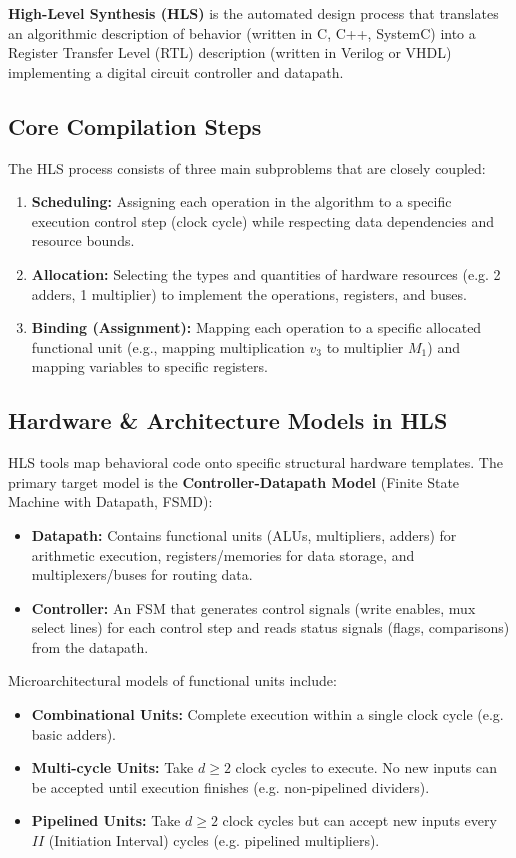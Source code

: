 \documentclass[12pt,a4paper]{article}
\begin{document}
\begin{tcolorbox}[defbox, title={High-Level Synthesis}]
  \textbf{High-Level Synthesis (HLS)} is the automated design process that translates an algorithmic description of behavior (written in C, C++, SystemC) into a Register Transfer Level (RTL) description (written in Verilog or VHDL) implementing a digital circuit controller and datapath.
\end{tcolorbox}

\subsection{Core Compilation Steps}
The HLS process consists of three main subproblems that are closely coupled:
\begin{enumerate}[leftmargin=*, itemsep=2pt]
  \item \textbf{Scheduling:} Assigning each operation in the algorithm to a specific execution control step (clock cycle) while respecting data dependencies and resource bounds.
  \item \textbf{Allocation:} Selecting the types and quantities of hardware resources (e.g. 2 adders, 1 multiplier) to implement the operations, registers, and buses.
  \item \textbf{Binding (Assignment):} Mapping each operation to a specific allocated functional unit (e.g., mapping multiplication $v_3$ to multiplier $M_1$) and mapping variables to specific registers.
\end{enumerate}

\subsection{Hardware \& Architecture Models in HLS}
HLS tools map behavioral code onto specific structural hardware templates. The primary target model is the \textbf{Controller-Datapath Model} (Finite State Machine with Datapath, FSMD):
\begin{itemize}[leftmargin=*, itemsep=3pt]
  \item \textbf{Datapath:} Contains functional units (ALUs, multipliers, adders) for arithmetic execution, registers/memories for data storage, and multiplexers/buses for routing data.
  \item \textbf{Controller:} An FSM that generates control signals (write enables, mux select lines) for each control step and reads status signals (flags, comparisons) from the datapath.
\end{itemize}
Microarchitectural models of functional units include:
\begin{itemize}[leftmargin=*, itemsep=2pt]
  \item \textbf{Combinational Units:} Complete execution within a single clock cycle (e.g. basic adders).
  \item \textbf{Multi-cycle Units:} Take $d \ge 2$ clock cycles to execute. No new inputs can be accepted until execution finishes (e.g. non-pipelined dividers).
  \item \textbf{Pipelined Units:} Take $d \ge 2$ clock cycles but can accept new inputs every $II$ (Initiation Interval) cycles (e.g. pipelined multipliers).
\end{itemize}
\end{document}

